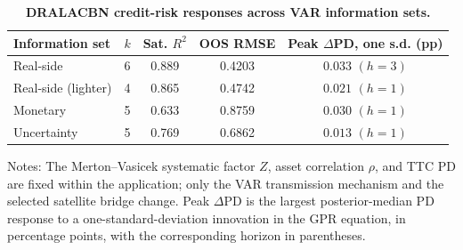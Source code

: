 \begin{table}[!htbp]
\centering
\scriptsize
\caption{\textbf{DRALACBN credit-risk responses across VAR information sets.}}
\label{tab:dralacbn_information_set_robustness}
\begin{tabular}{lcccc}
\toprule
Information set & $k$ & Sat. $R^2$ & OOS RMSE & Peak $\Delta$PD, one s.d. (pp) \\
\midrule
Real-side & 6 & 0.889 & 0.4203 & $0.033$ $(h=3)$ \\
Real-side (lighter) & 4 & 0.865 & 0.4742 & $0.021$ $(h=1)$ \\
Monetary & 5 & 0.633 & 0.8759 & $0.030$ $(h=1)$ \\
Uncertainty & 5 & 0.769 & 0.6862 & $0.013$ $(h=1)$ \\
\bottomrule
\end{tabular}
\begin{tablenotes}
\footnotesize
\item Notes: The Merton--Vasicek systematic factor $Z$, asset correlation $\rho$, and TTC PD are fixed within the application; only the VAR transmission mechanism and the selected satellite bridge change. Peak $\Delta$PD is the largest posterior-median PD response to a one-standard-deviation innovation in the GPR equation, in percentage points, with the corresponding horizon in parentheses.
\end{tablenotes}
\end{table}
